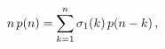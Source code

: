 \[n\mathop{p\/}\nolimits\!\left(n\right)=\sum_{k=1}^{n}\mathop{\sigma_{1}\/}%
\nolimits\!\left(k\right)\mathop{p\/}\nolimits\!\left(n-k\right),\]